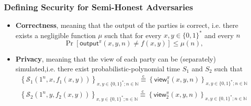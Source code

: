 \documentclass{beamer}
\begin{document}
    \begin{frame}
        \frametitle{Defining Security for Semi-Honest Adversaries}

        \begin{definition}
            \begin{itemize}
                \item \textbf{Correctness}, meaning that the output of the parties is correct, i.e. there exists a negligible function $\mu$ such that for every $x, y \in\{0,1\}^{*}$ and every $n$
                $$
                \operatorname{Pr}\left[\mathsf{output}^{\pi}(x, y, n) \neq f(x, y)\right] \leq \mu(n),
                $$
                
                \item \textbf{Privacy}, meaning that the view of each party can be (separately) simulated,i.e. there exist probabilistic-polynomial time $S_{1}$ and $S_{2}$ such that
                $$
                \begin{array}{l}
                \left\{\mathcal{S}_{1}\left(1^{n}, x, f_{1}(x, y)\right)\right\}_{x, y \in\{0,1\}^{*} ; n \in \mathbb{N}} \stackrel{\mathrm{c}}{\equiv}\left\{\mathsf{view}_{1}^{\pi}(x, y, n)\right\}_{x, y \in\{0,1\}^{*} ; n \in \mathbb{N}} \\
                \left\{\mathcal{S}_{2}\left(1^{n}, y, f_{2}(x, y)\right)\right\}_{x, y \in\{0,1\}^{*} ; n \in \mathbb{N}} \stackrel{\mathrm{c}}{\equiv}\left\{\mathsf{view}_{2}^{\pi}(x, y, n)\right\}_{x, y \in\{0,1\}^{*} ; n \in \mathbb{N}} 
                \end{array}
                $$
            \end{itemize}

        
        \end{definition}

    
        
    
    \end{frame}
\end{document}
